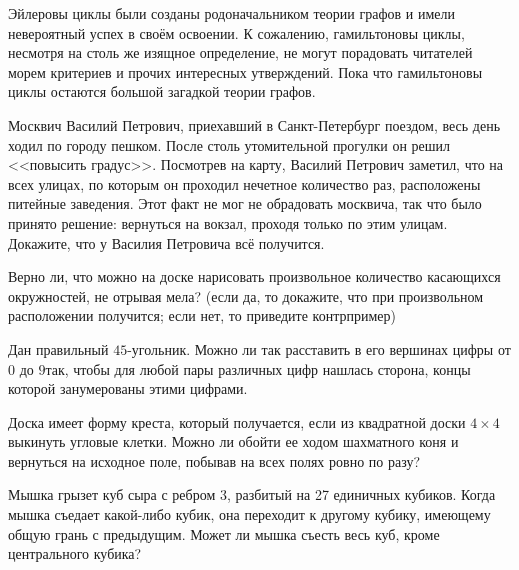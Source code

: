 	Эйлеровы циклы были созданы родоначальником теории графов и имели невероятный успех в своём освоении. К сожалению, гамильтоновы циклы, несмотря на столь же изящное определение, не могут порадовать читателей морем критериев и прочих интересных утверждений. Пока что гамильтоновы циклы остаются большой загадкой теории графов.


\begin{exersize}
	Москвич Василий Петрович, приехавший в Санкт-Петербург поездом, весь день ходил по городу пешком. После столь утомительной прогулки он решил <<повысить градус>>. Посмотрев на карту, Василий Петрович заметил, что на всех улицах, по которым он проходил нечетное количество раз, расположены питейные заведения. Этот факт не мог не обрадовать москвича, так что было принято решение: вернуться на вокзал, проходя только по этим улицам. Докажите, что у Василия Петровича всё получится.
\end{exersize}

\begin{exersize}
	Верно ли, что можно на доске нарисовать произвольное количество касающихся окружностей, не отрывая мела? (если да, то докажите, что при произвольном расположении получится; если нет, то приведите контрпример)
\end{exersize}

\begin{exersize}
	Дан правильный $45$-угольник. Можно ли так расставить в его вершинах цифры от $0$ до $9$так, чтобы для любой пары различных цифр нашлась сторона, концы которой занумерованы этими цифрами.
\end{exersize}


\begin{exersize}
	Доска имеет форму креста, который получается, если из квадратной доски $4 \times 4$ выкинуть угловые клетки. Можно ли обойти ее ходом шахматного коня и вернуться на исходное поле, побывав на всех полях ровно по разу?
\end{exersize}

\begin{exersize}
	Мышка грызет куб сыра с ребром 3, разбитый на 27 единичных кубиков. Когда мышка съедает какой-либо кубик, она переходит к другому кубику, имеющему общую грань с предыдущим. Может ли мышка съесть весь куб, кроме центрального кубика?
\end{exersize}

